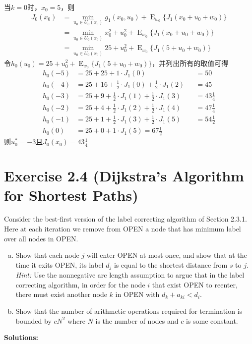\documentclass{article}
\begin{document}
\begin{enumerate}[(c)]
        当$k=0$时，$x_0=5$，则
        \begin{equation}
            \begin{split}
                J_0(x_0)&=\min_{u_0\in U_0(x_0)}g_1(x_0,u_0)+\mathop{E}_{w_0}\big\{J_1(x_0+u_0+w_0)\big\}\\
                &=\min_{u_0\in U_0(x_0)}x_0^2+u_0^2+\mathop{E}_{w_0}\big\{J_1(x_0+u_0+w_0)\big\}\\
                &=\min_{u_0\in U_0(x_0)}25+u_0^2+\mathop{E}_{w_0}\big\{J_1(5+u_0+w_0)\big\}
            \end{split}
        \end{equation}
        令$h_0(u_0)=25+u_0^2+\mathop{E}_{w_0}\big\{J_1(5+u_0+w_0)\big\}$，并列出所有的取值可得
        \begin{equation}
            \begin{aligned}
                h_0(-5)&=25+25+1\cdot J_1(0)&&=50\\
                h_0(-4)&=25+16+\frac{1}{2}\cdot J_1(0)+\frac{1}{2}\cdot J_1(2)&&=45\\
                h_0(-3)&=25+9+\frac{1}{2}\cdot J_1(1)+\frac{1}{2}\cdot J_1(3)&&=43\frac{1}{4}\\
                h_0(-2)&=25+4+\frac{1}{2}\cdot J_1(2)+\frac{1}{2}\cdot J_1(4)&&=47\frac{1}{4}\\
                h_0(-1)&=25+1+\frac{1}{2}\cdot J_1(3)+\frac{1}{2}\cdot J_1(5)&&=54\frac{1}{2}\\
                h_0(0)&=25+0+1\cdot J_1(5)=67\frac{1}{2}
            \end{aligned}
        \end{equation}
        则$u_0^*=-3$且$J_0(x_0)=43\frac{1}{4}$

    \end{enumerate}
   

    \section{Exercise 2.4 (Dijkstra's Algorithm for Shortest Paths)}
    Consider the best-first version of the label correcting algorithm of Section 2.3.1. Here at each iteration we remove from OPEN a node that has minimum label over all nodes in OPEN.
    \begin{enumerate}[(a)]
        \item Show that each node $j$ will enter OPEN at most once, and show that at the time it exits OPEN, its label $d_j$ is equal to the shortest distance from $s$ to $j$. \textit{Hint:} Use the nonnegative arc length assumption to argue that in the label correcting algorithm, in order for the node $i$ that exist OPEN to reenter, there must exist another node $k$ in OPEN with $d_k+a_{ki}<d_i$.
        \item Show that the number of arithmetic operations required for termination is bounded by $cN^2$ where $N$ is the number of nodes and $c$ is some constant.
    \end{enumerate}
    \textbf{Solutions:}
    
\end{document}
